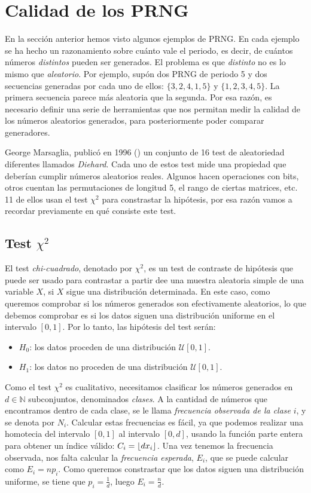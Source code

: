 \section{Calidad de los PRNG}


En la sección anterior hemos visto algunos ejemplos de PRNG. En cada ejemplo se ha hecho un razonamiento sobre cuánto vale el  periodo, es decir, de cuántos números \textit{distintos} pueden ser generados. El problema es que \textit{distinto} no es lo mismo que \textit{aleatorio}. Por ejemplo, supón dos PRNG de periodo 5 y dos secuencias generadas por cada uno de ellos: $\{3,2,4,1,5\}$ y $\{1,2,3,4,5\}$. La primera secuencia parece más aleatoria que la segunda. Por esa razón, es necesario definir una serie de herramientas que nos permitan medir la calidad de los números aleatorios generados, para posteriormente poder comparar generadores.

George Marsaglia, publicó en 1996 (\cite{marsaglia1996}) un conjunto de 16 test de aleatoriedad diferentes llamados \textit{Diehard}. Cada uno de estos test mide una propiedad que deberían cumplir números aleatorios reales. Algunos hacen operaciones con bits, otros cuentan las permutaciones de longitud 5,  el rango de ciertas matrices, etc. 11 de ellos usan el test $\chi^2$ para constrastar la hipótesis, por esa razón vamos a recordar previamente en qué consiste este test.

\subsection{Test $\chi^2$}

El test \textit{chi-cuadrado}, denotado por $\chi^2$, es un test de contraste de hipótesis que puede ser usado para contrastar a partir dee una muestra aleatoria simple de una variable $X$, si $X$ sigue una distribución determinada. En este caso, como queremos comprobar si los números generados son efectivamente aleatorios, lo que debemos comprobar es si los datos siguen una distribución uniforme en el intervalo $[0,1]$. Por lo tanto, las hipótesis del test serán:
\begin{itemize}
\item $H_0$: los datos proceden de una distribución $\mathcal{U}[0,1]$.
\item $H_1$: los datos no proceden de una distribución $\mathcal{U}[0,1]$.
\end{itemize}
Como el test $\chi^2$ es cualitativo, necesitamos clasificar los números generados en $d\in\mathbb{N}$ subconjuntos, denominados \textit{clases}. A la cantidad de números que encontramos dentro de cada clase, se le llama \textit{frecuencia observada de la clase} $i$, y se denota por $N_i$. Calcular estas frecuencias es fácil, ya que podemos realizar una homotecia del intervalo $[0,1]$ al intervalo $[0,d]$, usando la función parte entera para obtener un índice válido: $C_i=\left\lfloor d x_i \right\rfloor$. Una vez tenemos la frecuencia observada, nos falta calcular la \textit{frecuencia esperada}, $E_i$, que se puede calcular como $E_i=np_i$. Como queremos constrastar que los datos siguen una distribución uniforme, se tiene que $p_i=\frac{1}{d}$, luego $E_i=\frac{n}{d}$. 

